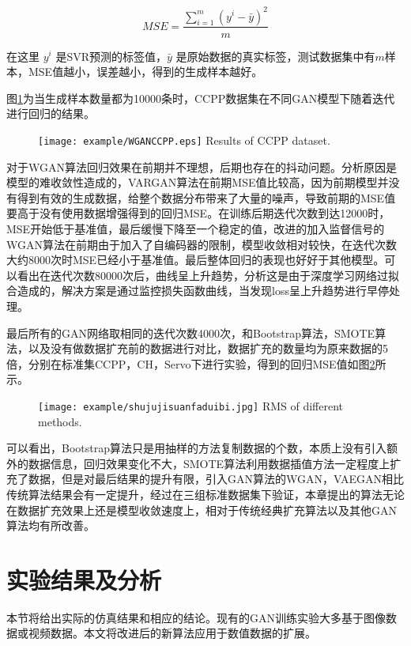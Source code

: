 \begin{equation}
\label{eq14}
MSE=\frac{\sum \limits_{i=1}^m (y^{i}-\bar{y})^{2}}{m}
\end{equation}

在这里 $y^{i}$ 是SVR预测的标签值，$\bar{y}$ 是原始数据的真实标签，测试数据集中有$m$样本，MSE值越小，误差越小，得到的生成样本越好。

图\ref{figCCPP}为当生成样本数量都为10000条时，CCPP数据集在不同GAN模型下随着迭代进行回归的结果。
\begin{figure}[htbp]
	\centering
	\texttt{[image: example/WGANCCPP.eps]}
	{Results of CCPP dataset.}
	\label{figCCPP}
\end{figure}

对于WGAN算法回归效果在前期并不理想，后期也存在的抖动问题。分析原因是模型的难收敛性造成的，VARGAN算法在前期MSE值比较高，因为前期模型并没有得到有效的生成数据，给整个数据分布带来了大量的噪声，导致前期的MSE值要高于没有使用数据增强得到的回归MSE。在训练后期迭代次数到达12000时，MSE开始低于基准值，最后缓慢下降至一个稳定的值，改进的加入监督信号的WGAN算法在前期由于加入了自编码器的限制，模型收敛相对较快，在迭代次数大约8000次时MSE已经小于基准值。最后整体回归的表现也好好于其他模型。可以看出在迭代次数80000次后，曲线呈上升趋势，分析这是由于深度学习网络过拟合造成的，解决方案是通过监控损失函数曲线，当发现loss呈上升趋势进行早停处理。

最后所有的GAN网络取相同的迭代次数4000次，和Bootstrap算法，SMOTE算法，以及没有做数据扩充前的数据进行对比，数据扩充的数量均为原来数据的5倍，分别在标准集CCPP，CH，Servo下进行实验，得到的回归MSE值如图\ref{fig:MSE}所示。

\begin{figure}[htpb]
	\centering
	\texttt{[image: example/shujujisuanfaduibi.jpg]}
	{RMS of different methods.}
	\label{fig:MSE}
\end{figure}

可以看出，Bootstrap算法只是用抽样的方法复制数据的个数，本质上没有引入额外的数据信息，回归效果变化不大，SMOTE算法利用数据插值方法一定程度上扩充了数据，但是对最后结果的提升有限，引入GAN算法的WGAN，VAEGAN相比传统算法结果会有一定提升，经过在三组标准数据集下验证，本章提出的算法无论在数据扩充效果上还是模型收敛速度上，相对于传统经典扩充算法以及其他GAN算法均有所改善。


\section{实验结果及分析}
本节将给出实际的仿真结果和相应的结论。现有的GAN训练实验大多基于图像数据或视频数据。本文将改进后的新算法应用于数值数据的扩展。

